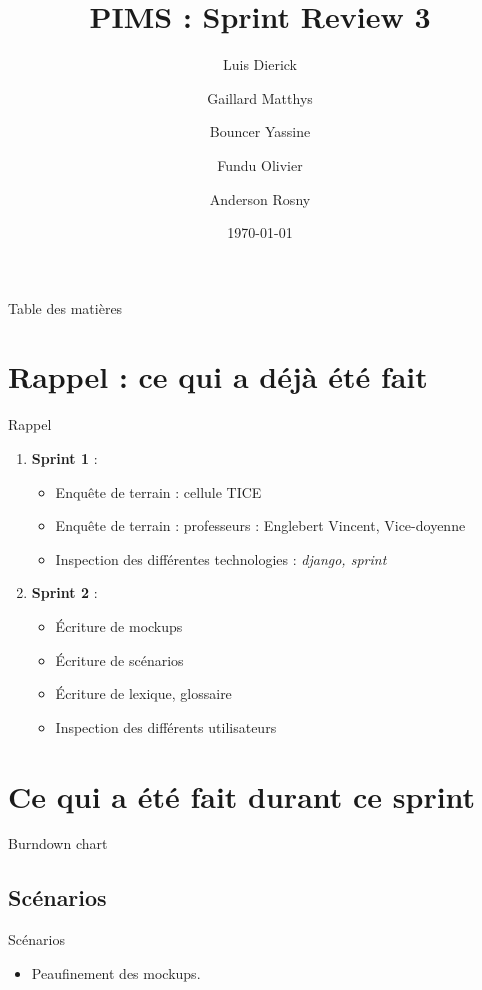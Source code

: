 \documentclass[numbering=fraction]{beamer}
\title{PIMS : Sprint Review 3}
\author[PIMS]{Luis Dierick \and Gaillard Matthys \and Bouncer Yassine \and Fundu Olivier \and Anderson Rosny }
\institute{Université de Namur}
\date{\today}
\begin{document}
\begin{frame}[plain]{}
    \maketitle
\end{frame}

\begin{frame}{Table des matières}
    \tableofcontents
\end{frame}
\section{Rappel : ce qui a déjà été fait}
\begin{frame}{Rappel}
    \begin{enumerate}
        \item \textbf{Sprint 1} :
        \begin{itemize}
            \item Enquête de terrain : cellule TICE 
            \item Enquête de terrain : professeurs : Englebert Vincent, Vice-doyenne
            \item Inspection des différentes technologies : \textit{django, sprint}
        \end{itemize}
        \item \textbf{Sprint 2} : 
        \begin{itemize}
            \item Écriture de mockups
            \item Écriture de scénarios
            \item Écriture de lexique, glossaire
            \item Inspection des différents utilisateurs
        \end{itemize}
    \end{enumerate}
\end{frame}
\section{Ce qui a été fait durant ce sprint}

\begin{frame}{Burndown chart}
    
\end{frame}

\subsection{Scénarios}
\begin{frame}{Scénarios}
    \begin{itemize}
        \item Peaufinement des mockups.
    \end{itemize}
\end{frame}
\end{document}
